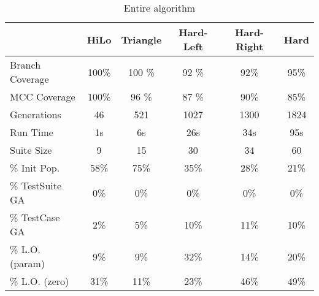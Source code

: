 \documentclass[runningheads]{llncs}
\begin{document}
\begin{table}[h!]
	\begin{center}
		
		\def\arraystretch{1.3}%
		\setlength\tabcolsep{1em}
		\begin{tabular}{| l | c  c  c  c c |}
			\hline
				             & HiLo  		 & Triangle		& Hard-Left	& 	Hard-Right 		& Hard		\\ \hline
			Branch Coverage	 & 100\%         & 100	\%      & 92 \%      	& 92\%          & 95\%      \\ \hline
			MCC Coverage	 & 100\%         & 96 \%        & 87 \%      	& 90\%          & 85\%      \\ \hline
			Generations		 & 46          	 & 521          & 1027       	& 1300          & 1824      \\ \hline
			Run Time		 & 1s          	 & 6s           & 26s       	& 34s          	& 95s       \\ \hhline{|=|=====|}
			
			Suite Size       & 9        	& 15       	 	& 30			& 34          	& 60        \\ \hline
			\% Init Pop.     & 58\%         & 75\%       	& 35\%       	& 28\%         	& 21\%      \\ \hline
			\% TestSuite GA  & 0\%          & 0\%       	& 0\%			& 0\%          	& 0\%       \\ \hline
			\% TestCase GA  & 2\%          & 5\%       	& 10\%      	& 11\%         	& 10\%      \\ \hline
			\% 	L.O. (param) & 9\%          & 9\%       	& 32\%       	& 14\%          & 20\%      \\ \hline
			\% L.O. (zero)	 & 31\%         & 11\%      	& 23\%       	& 46\%          & 49\%      \\ \hline
		\end{tabular}
	\end{center}
	\caption{Entire algorithm}  
	\label{tab:CovAll}
\end{table}
\end{document}
